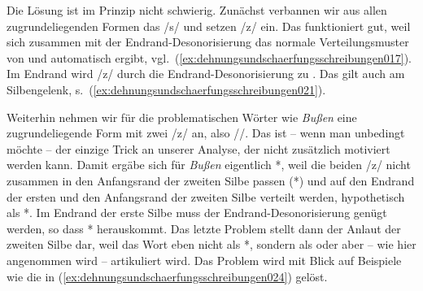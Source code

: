 Die Lösung ist im Prinzip nicht schwierig.
Zunächst verbannen wir aus allen zugrundeliegenden Formen das /s/ und setzen /z/ ein.
Das funktioniert gut, weil sich zusammen mit der Endrand-Desonorisierung das normale Verteilungsmuster von \textipa{[s]} und \textipa{[z]} automatisch ergibt, vgl.\ (\ref{ex:dehnungsundschaerfungsschreibungen017}).
Im Endrand wird /z/ durch die Endrand-Desonorisierung zu \textipa{[s]}.
Das gilt auch am Silbengelenk, s.\ (\ref{ex:dehnungsundschaerfungsschreibungen021}).

\begin{exe}
\end{exe}

Weiterhin nehmen wir für die problematischen Wörter wie \textit{Bußen} eine zugrundeliegende Form mit zwei /z/ an, also //.
Das ist -- wenn man unbedingt möchte -- der einzige Trick an unserer Analyse, der nicht zusätzlich motiviert werden kann.
Damit ergäbe sich für \textit{Bußen} eigentlich *\textipa{[bu:s.z@n]}, weil die beiden /z/ nicht zusammen in den Anfangsrand der zweiten Silbe passen (*\textipa{[zz@n]}) und auf den Endrand der ersten und den Anfangsrand der zweiten Silbe verteilt werden, hypothetisch als *\textipa{[bu:z.z@n]}.
Im Endrand der erste Silbe muss der Endrand-Desonorisierung genügt werden, so dass *\textipa{[bu:s.z@n]} herauskommt.
Das letzte Problem stellt dann der Anlaut der zweiten Silbe dar, weil das Wort eben nicht als *\textipa{[bu:s.z@n]}, sondern als \textipa{[bu:.s@n]} oder aber -- wie hier angenommen wird -- \textipa{[bu:s.sen]} artikuliert wird.
Das Problem wird mit Blick auf Beispiele wie die in (\ref{ex:dehnungsundschaerfungsschreibungen024}) gelöst.

\begin{exe}
  \ex\label{ex:dehnungsundschaerfungsschreibungen024}
  \begin{xlist}
  \end{xlist}
\end{exe}

